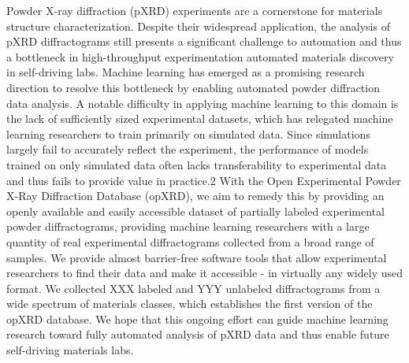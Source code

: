 Powder X-ray diffraction (pXRD) experiments are a cornerstone for materials structure characterization.
Despite their widespread application, the analysis of pXRD diffractograms still presents a significant challenge to automation and thus a bottleneck in high-throughput experimentation automated materials discovery in self-driving labs.
Machine learning has emerged as a promising research direction to resolve this bottleneck by enabling automated powder diffraction data analysis.
A notable difficulty in applying machine learning to this domain is the lack of sufficiently sized experimental datasets, which has relegated machine learning researchers to train primarily on simulated data. Since simulations largely fail to accurately reflect the experiment, the performance of models trained on only simulated data often lacks transferability to experimental data and thus fails to provide value in practice.2
With the Open Experimental Powder X-Ray Diffraction Database (opXRD), we aim to remedy this by providing an openly available and easily accessible dataset of partially labeled experimental powder diffractograms, providing machine learning researchers with a large quantity of real experimental diffractograms collected from a broad range of samples.
We provide almost barrier-free software tools that allow experimental researchers to find their data and make it accessible - in virtually any widely used format.
We collected XXX labeled and YYY unlabeled diffractograms from a wide spectrum of materials classes, which establishes the first version of the opXRD database.
We hope that this ongoing effort can guide machine learning research toward fully automated analysis of pXRD data and thus enable future self-driving materials labs.